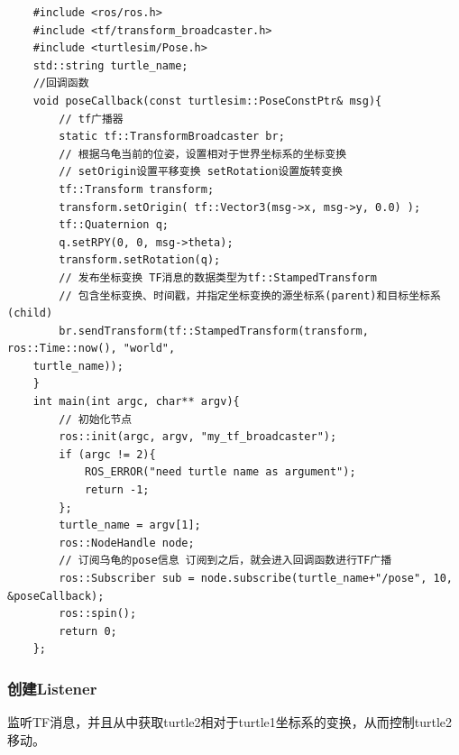 \documentclass[9pt, oneside]{book}
\begin{document}
\begin{verbatim}
    #include <ros/ros.h>
    #include <tf/transform_broadcaster.h>
    #include <turtlesim/Pose.h>
    std::string turtle_name;
    //回调函数
    void poseCallback(const turtlesim::PoseConstPtr& msg){
        // tf广播器
        static tf::TransformBroadcaster br;
        // 根据乌龟当前的位姿，设置相对于世界坐标系的坐标变换
        // setOrigin设置平移变换 setRotation设置旋转变换
        tf::Transform transform;
        transform.setOrigin( tf::Vector3(msg->x, msg->y, 0.0) );
        tf::Quaternion q;
        q.setRPY(0, 0, msg->theta);
        transform.setRotation(q);
        // 发布坐标变换 TF消息的数据类型为tf::StampedTransform
        // 包含坐标变换、时间戳，并指定坐标变换的源坐标系(parent)和目标坐标系(child)
        br.sendTransform(tf::StampedTransform(transform, ros::Time::now(), "world", 
    turtle_name));
    }
    int main(int argc, char** argv){
        // 初始化节点
        ros::init(argc, argv, "my_tf_broadcaster");
        if (argc != 2){
            ROS_ERROR("need turtle name as argument"); 
            return -1;
        };
        turtle_name = argv[1];
        ros::NodeHandle node;
        // 订阅乌龟的pose信息 订阅到之后，就会进入回调函数进行TF广播
        ros::Subscriber sub = node.subscribe(turtle_name+"/pose", 10, &poseCallback);
        ros::spin();
        return 0;
    };
\end{verbatim}

\subsubsection{创建Listener}

监听TF消息，并且从中获取turtle2相对于turtle1坐标系的变换，从而控制turtle2移动。
\end{document}
